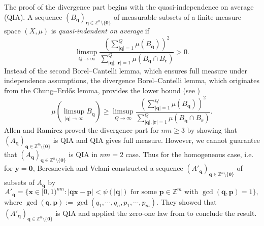 \documentclass[reqno]{amsart}
\theoremstyle{definition}
\theoremstyle{remark}
\begin{document}
The proof of the divergence part begins with the quasi-independence on average (QIA). A sequence $(B_\mathbf{q})_{\mathbf{q} \in \mathbb{Z}^n \setminus \{ \mathbf{0}\}}$ of measurable subsets of a finite measure space $(X,\mu)$ is \emph{quasi-indendent on average} if
$$\limsup_{Q \to \infty} \frac{\left(\sum_{|\mathbf{q}|=1}^Q \mu(B_\mathbf{q})\right)^2}{\sum_{|\mathbf{q}|,|\mathbf{r}|=1}^Q \mu(B_\mathbf{q} \cap B_\mathbf{r})}>0.$$
Instead of the second Borel--Cantelli lemma, which ensures full measure under independence assumptions, the divergence Borel--Cantelli lemma, which originates from the Chung--Erd\H{o}s lemma, provides the lower bound (see \cite[Chap 1, Lemma 5]{Spr79})
$$\mu(\limsup_{|\mathbf{q}| \to \infty}B_\mathbf{q}) \geq \limsup_{Q \to \infty} \frac{\left(\sum_{|\mathbf{q}|=1}^Q \mu(B_\mathbf{q})\right)^2}{\sum_{|\mathbf{q}|,|\mathbf{r}|=1}^Q \mu(B_\mathbf{q} \cap B_\mathbf{r})}.$$
Allen and Ram\'{i}rez \cite{AR22} proved the divergence part for $nm\geq 3$ by showing that $(A_\mathbf{q})_{\mathbf{q} \in \mathbb{Z}^n \setminus \{\mathbf{0}\}}$ is QIA and QIA gives full measure. However, we cannot guarantee that $(A_\mathbf{q})_{\mathbf{q} \in \mathbb{Z}^n \setminus \{\mathbf{0}\}}$ is QIA in $nm=2$ case. Thus for the homogeneous case, i.e. for $\mathbf{y} = \mathbf{0}$, Beresnevich and Velani \cite{BV09} constructed a sequence $(A'_\mathbf{q})_{\mathbf{q} \in \mathbb{Z}^n \setminus \{\mathbf{0}\}}$ of subsets of $A_\mathbf{q}$ by
$$A'_\mathbf{q} = \{\mathbf{x} \in [0,1)^{nm} : |\mathbf{qx} - \mathbf{p}|< \psi(|\mathbf{q}|) \text{ for some } \mathbf{p} \in \mathbb{Z}^m \text{ with } \gcd(\mathbf{q},\mathbf{p})=1\},$$
where $\gcd(\mathbf{q}, \mathbf{p}) := \gcd(q_1, \cdots, q_n, p_1, \cdots, p_m).$
They \cite{BV09} showed that $(A'_\mathbf{q})_{\mathbf{q} \in \mathbb{Z}^n \setminus \{\mathbf{0}\}}$ is QIA and applied the zero-one law from \cite{BV08} to conclude the result.
\end{document}

